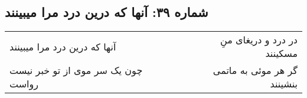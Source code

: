 \begin{center}
\section*{شماره ۳۹: آنها که درین درد مرا میبینند}
\label{sec:039}
\begin{longtable}{l p{0.5cm} r}
آنها که درین درد مرا میبینند
&&
در درد و دریغای منِ مسکینند
\\
چون یک سر موی از تو خبر نیست رواست
&&
گر هر موئی به ماتمی بنشینند
\\
\end{longtable}
\end{center}
